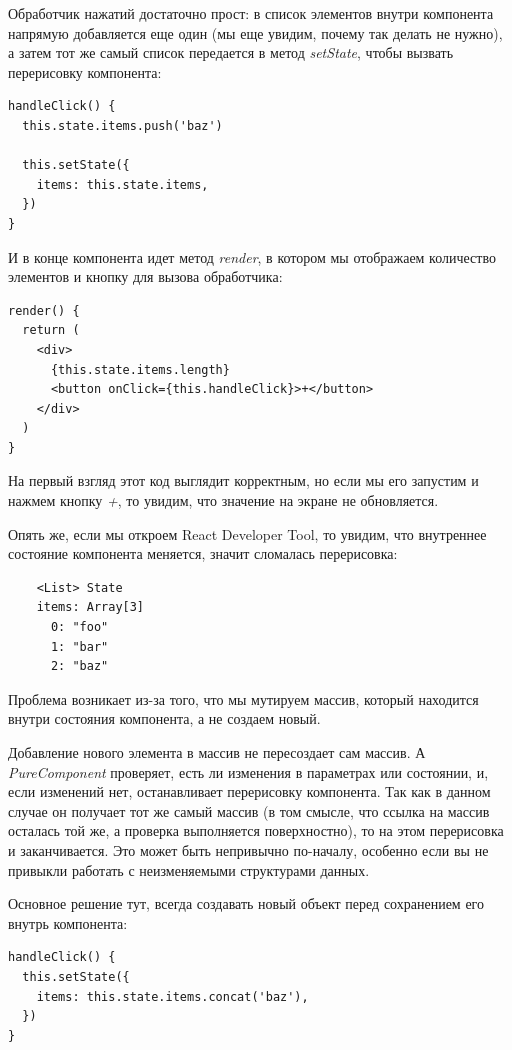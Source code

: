 Обработчик нажатий достаточно прост: в список элементов внутри компонента напрямую добавляется еще один (мы еще увидим, почему так делать не нужно), а затем тот же самый список передается в метод \textit{setState}, чтобы вызвать перерисовку компонента:

\begin{lstlisting}
handleClick() {
  this.state.items.push('baz')
  
  this.setState({
    items: this.state.items,
  })
}
\end{lstlisting}

И в конце компонента идет метод \textit{render}, в котором мы отображаем количество элементов и кнопку для вызова обработчика:

\begin{lstlisting}
render() {
  return (
    <div>
      {this.state.items.length}
      <button onClick={this.handleClick}>+</button>
    </div>
  )
}
\end{lstlisting}

На первый взгляд этот код выглядит корректным, но если мы его запустим и нажмем кнопку \textit{+}, то увидим, что значение на экране не обновляется.

Опять же, если мы откроем React Developer Tool, то увидим, что внутреннее состояние компонента меняется, значит сломалась перерисовка:

\begin{lstlisting}
    <List> State
    items: Array[3]
      0: "foo"
      1: "bar"
      2: "baz"
\end{lstlisting}

Проблема возникает из-за того, что мы мутируем массив, который находится внутри состояния компонента, а не создаем новый.

Добавление нового элемента в массив не пересоздает сам массив. А \textit{PureComponent} проверяет, есть ли изменения в параметрах или состоянии, и, если изменений нет, останавливает перерисовку компонента. Так как в данном случае он получает тот же самый массив (в том смысле, что ссылка на массив осталась той же, а проверка выполняется поверхностно), то на этом перерисовка и заканчивается. Это может быть непривычно по-началу, особенно если вы не привыкли работать с неизменяемыми структурами данных.

Основное решение тут, всегда создавать новый объект перед сохранением его внутрь компонента:

\begin{lstlisting}
handleClick() {
  this.setState({
    items: this.state.items.concat('baz'),
  })
}
\end{lstlisting}


